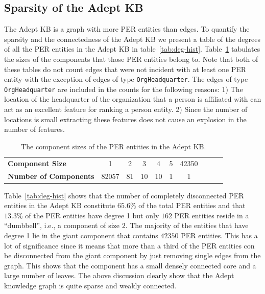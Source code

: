 \documentclass[paper=a4,fontsize=11pt]{scrartcl}
\newcommand{\ie}{i.e.,\xspace}
\newcommand{\tabref}[1]{table~\ref{#1}}
\newcommand{\Tabref}[1]{Table~\ref{#1}}
\numberwithin{equation}{section}    %
\numberwithin{figure}{section}      %
\numberwithin{table}{section}       %
\begin{document}
\subsection{Sparsity of the Adept KB}
\label{sec:graph-sparsity}
The Adept KB is a graph with more \textsc{PER} entities than edges.
To quantify the sparsity and the connectedness of the Adept KB we present
a table of the degrees of all the \textsc{PER} entities in the Adept KB
in \tabref{tab:deg-hist}. \Tabref{tab:hist-comp} tabulates the
sizes of the components that those \textsc{PER} entities belong to.
Note that both of these tables do not count edges that were not incident
with at least one \textsc{PER} entity with the exception of edges of type
\texttt{OrgHeadquarter}. The edges of type \texttt{OrgHeadquarter} are
included in the counts for the following reasons:
1) The location of the headquarter of the organization that a person is affiliated
with can act as an excellent feature for ranking a person entity.
2) Since the number of locations is small extracting these features does not
cause an explosion in the number of features.
\begin{table}[htbp]
  \centering
  \caption{Table of degrees for the \textsc{PER} entities in the Adept KB.}
  \label{tab:deg-hist}
\end{table}

\begin{table}[htbp]
  \centering
  \begin{tabular}{l | c c c c c c c c c }
    \textbf{Component Size}     & 1     & 2  & 3  & 4  & 5 & 42350 \\
  \textbf{Number of Components} & 82057 & 81 & 10 & 10 & 1 & 1     \\
  \end{tabular}
  \caption{The component sizes of the \textsc{PER} entities in the Adept KB.}
  \label{tab:hist-comp}
\end{table}

\Tabref{tab:deg-hist} shows that the number of
completely disconnected \textsc{PER} entities in the Adept KB constitute $65.6\%$
of the total \textsc{PER} entities and that $13.3\%$ of the \textsc{PER}
entities have degree 1 but only $162$ \textsc{PER} entities reside in a ``dumbbell'', \ie a component of size $2$. The majority of the entities that have degree 1 lie in the
giant component that contains $42350$ \textsc{PER} entities. This has a lot of significance since it means that more than a third of the \textsc{PER} entities con be disconnected from the giant component by just removing single edges from the graph. This shows
that the component has a small densely connected core and a large number of leaves.
The above discussion clearly show that the Adept knowledge graph is quite sparse
and weakly connected.
\end{document}
